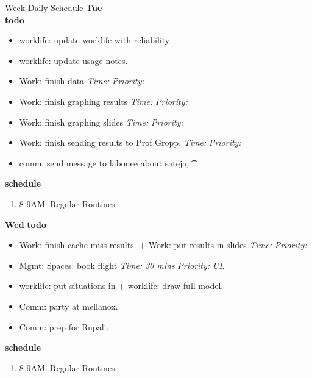 \documentclass[serif, mathserif, final]{beamer}
\newcommand{\timeEst}[1]{\textit{Time:} \textit{#1}}
\newcommand{\priority}[1]{\textit{Priority:} \textit{#1}}
\newcommand{\deadline}[1]{#1}
\begin{document}
\begin{frame}{}
\begin{columns}
\begin{column}{0.50\linewidth}
\begin{block}{Week Daily Schedule}
  \textbf{\small \underline{Tue}} \\ 
  \textbf{\small todo} \\
  \begin{itemize} 
    \tiny  add in situations  
    \tiny \item \tiny worklife: update worklife  with reliability 
    \tiny \item \tiny worklife: update usage notes. 
    \tiny \item \tiny Work: finish data  \deadline{ }   \timeEst{}  \priority{} 
    \tiny \item \tiny Work: finish graphing results  \deadline{ }   \timeEst{}  \priority{} 
    \tiny \item \tiny Work: finish graphing slides  \deadline{ }   \timeEst{}  \priority{} 
    \tiny \item \tiny Work: finish sending results to Prof Gropp.  \deadline{ }   \timeEst{}  \priority{}               
    \tiny \item \tiny comm: send message to labonee about sateja  \d{   } \t{   }  \p{ } 
  \end{itemize}  
  \textbf{\small schedule}\\ 
  \begin{enumerate} 
    \tiny \item \tiny 8-9AM: Regular Routines 
  \end{enumerate}  

  \textbf{\small {\underline{Wed}}}
  \textbf{\small todo} \\
  \begin{itemize} 
    \tiny \item \tiny Work: finish cache miss results.  + Work: put results in slides  \deadline{}  \timeEst{}  \priority{} 
    \tiny \item Mgmt: Spaces: book flight  \deadline{  }  \timeEst{30 mins} \priority{UI}. 
    \tiny \item worklife: put situations in + worklife: draw full model. 
    \tiny \item Comm: party at mellanox. 
    \tiny \item Comm: prep for Rupali. 
  \end{itemize}  
  \textbf{\small schedule} \\  
  \begin{enumerate} 
    \tiny \item \tiny 8-9AM: Regular Routines 
  \end{enumerate}  



\end{block}
\end{column}
\end{columns}
\end{frame}
\end{document}
